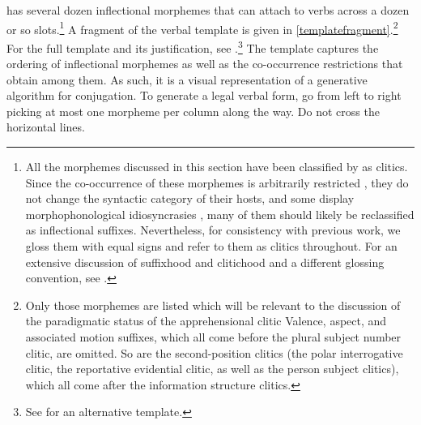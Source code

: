 \documentclass[output=paper,colorlinks,citecolor=brown]{langscibook}
\begin{document}
{ has several dozen inflectional morphemes that can attach to verbs across a dozen or so slots.}\footnote{All the morphemes discussed in this section have been classified by \citet{fischerhengeveld} as clitics. Since the co-occurrence of these morphemes is arbitrarily restricted \citep{zwicky1983cliticization}, they do not change the syntactic category of their hosts, and some display morphophonological idiosyncrasies \citep{dabkowski2019morphophonology}, many of them should likely be reclassified as inflectional suffixes. Nevertheless, for consistency with previous work, we gloss them with equal signs and refer to them as clitics throughout. For an extensive discussion of  suffixhood and clitichood and a different glossing convention, see \citet{dabkowski2019morphophonology}.} A fragment of the verbal template is given in \autoref{templatefragment}.\footnote{Only those morphemes are listed which will be relevant to the discussion of the paradigmatic status of the apprehensional clitic \sane[.] Valence, aspect, and associated motion suffixes, which all come before the plural subject  number clitic, are omitted. So are the second-position clitics (the polar interrogative  clitic, the reportative evidential  clitic, as well as the person subject clitics), which all come after the information structure clitics.} For the full template and its justification, see \citet{dabkowski2019morphophonology,dabkowski2021phonology,dabkowski2023nllt}.\footnote{{See \citet{fischerhengeveld} for an alternative template.}} The template captures the ordering of inflectional morphemes as well as the co-occurrence restrictions that obtain among them. As such, it is a visual representation of a generative algorithm for  conjugation. To generate a legal verbal form, go from left to right picking at most one morpheme per column along the way. Do not cross the horizontal lines.
\end{document}
